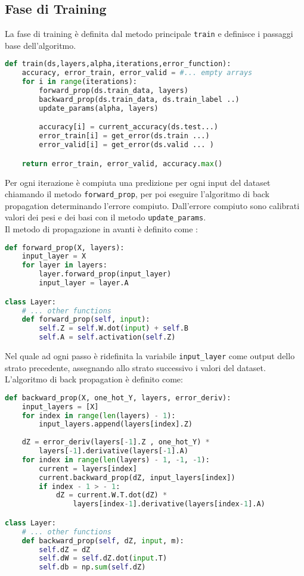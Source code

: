 \subsection{Fase di Training}
La fase di training è definita dal metodo principale \texttt{train} e definisce i passaggi base dell'algoritmo.
\begin{lstlisting}[language=Python]
def train(ds,layers,alpha,iterations,error_function):
    accuracy, error_train, error_valid = #... empty arrays
    for i in range(iterations):
        forward_prop(ds.train_data, layers)
        backward_prop(ds.train_data, ds.train_label ..)
        update_params(alpha, layers)

        accuracy[i] = current_accuracy(ds.test...)
        error_train[i] = get_error(ds.train ...)
        error_valid[i] = get_error(ds.valid ... )

    return error_train, error_valid, accuracy.max()
\end{lstlisting}
Per ogni iterazione è compiuta una predizione per ogni input del dataset chiamando il metodo \texttt{forward\_prop}, per poi eseguire l'algoritmo di back propagation determinando l'errore compiuto. Dall'errore compiuto sono calibrati valori dei pesi e dei basi con il metodo \texttt{update\_params}. \\
Il metodo di propagazione in avanti è definito come :
\begin{lstlisting}[language=Python]
def forward_prop(X, layers):
    input_layer = X
    for layer in layers:
        layer.forward_prop(input_layer)
        input_layer = layer.A

class Layer:
    # ... other functions
    def forward_prop(self, input):
        self.Z = self.W.dot(input) + self.B
        self.A = self.activation(self.Z)
\end{lstlisting}
Nel quale ad ogni passo è ridefinita la variabile \texttt{input\_layer} come output dello strato precedente, assegnando allo strato successivo i valori del dataset. \\
L'algoritmo di back propagation è definito come:
\begin{lstlisting}[language=Python]
def backward_prop(X, one_hot_Y, layers, error_deriv):
    input_layers = [X]
    for index in range(len(layers) - 1):
        input_layers.append(layers[index].Z)
    
    dZ = error_deriv(layers[-1].Z , one_hot_Y) *
        layers[-1].derivative(layers[-1].A)
    for index in range(len(layers) - 1, -1, -1):
        current = layers[index]
        current.backward_prop(dZ, input_layers[index])
        if index - 1 > - 1:
            dZ = current.W.T.dot(dZ) *
                layers[index-1].derivative(layers[index-1].A)

class Layer:
    # ... other functions
    def backward_prop(self, dZ, input, m):
        self.dZ = dZ
        self.dW = self.dZ.dot(input.T)
        self.db = np.sum(self.dZ)
\end{lstlisting}

